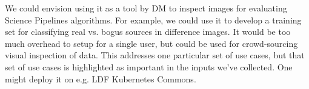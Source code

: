 We could envision using it as a tool by DM to inspect images for evaluating Science Pipelines algorithms.
For example, we could use it to develop a training set for classifying real vs. bogus sources in difference images.
It would be too much overhead to setup for a single user, but could be used for crowd-sourcing visual inspection of data.
This addresses one particular set of use cases, but that set of use cases is highlighted as important in the inputs we've collected.
One might deploy it on e.g. LDF Kubernetes Commons.

